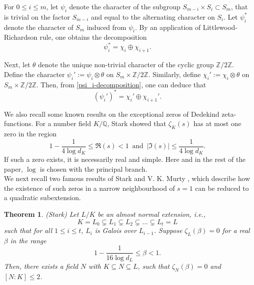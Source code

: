 \documentclass[12pt]{amsart}
\newtheorem{theorem}{Theorem}[section]
\theoremstyle{definition}
\newcommand{\Q}{\mathbb{Q}}
\newcommand{\Z}{\mathbb{Z}}
\begin{document}
For $0\leq i\leq m$, let $\psi_i$ denote the character of the subgroup $S_{m-i}\times S_i \subset S_m$, that is trivial on the factor $S_{m-i}$ and equal to the alternating character on $S_i$. Let $\psi_i^*$ denote the character of $S_m$ induced from $\psi_i$. By an application of Littlewood-Richardson rule, one obtains the decomposition
\begin{equation}\label{psi_i-decomposition}
    \psi_i^* = \chi_i \oplus \chi_{i+1}.
\end{equation}

Next, let $\theta$ denote the unique non-trivial character of the cyclic group $\Z/2\Z$. Define the character $\psi_i' := \psi_i\otimes \theta$ on $S_m\times \Z/2\Z$. Similarly, define $\chi_i':=\chi_i\otimes \theta$ on $S_m\times \Z/2\Z$. Then, from \eqref{psi_i-decomposition}, one can deduce that
\begin{equation*}
    (\psi_i')^* = \chi_i'  \oplus \chi_{i+1}'.
\end{equation*}
\bigskip

We also recall some known results on the exceptional zeros of Dedekind zeta-functions. For a number field $K/\Q$, Stark \cite{Stk} showed that $\zeta_K(s)$ has at most one zero in the region
\begin{equation}\label{stark-region}
    1-\frac{1}{4\log d_K} \leq \Re(s) <1\,\,\, \text{and}\,\,\, |\Im(s)|\leq \frac{1}{4\log d_K}.
\end{equation}
If such a zero exists, it is necessarily real and simple. Here and in the rest of the paper, $\log$ is chosen with the principal branch. \\ 

We next recall two famous results of Stark \cite{Stk} and V. K. Murty \cite{Km}, which describe how the existence of such zeros in a narrow neighbourhood of $s=1$ can be reduced to a quadratic subextension.

\begin{theorem}\label{Stark-almost-normal}(Stark)
    Let $L/K$ be an almost normal extension, i.e.,
    \begin{equation*}
        K=L_0\subsetneq L_1\subsetneq L_2\subsetneq \ldots\subsetneq L_t=L
    \end{equation*}
    such that for all $1\leq i\leq t$, $L_i$ is Galois over $L_{i-1}$. Suppose $\zeta_L(\beta)=0$ for a real $\beta$ in the range
    \begin{equation*}
        1-\frac{1}{16 \log d_L} \leq \beta<1.
    \end{equation*}
    Then, there exists a field $N$ with $K\subseteq N\subseteq L$, such that $\zeta_N(\beta) = 0$ and $[N:K]\leq 2$.
    \end{theorem}
\end{document}
